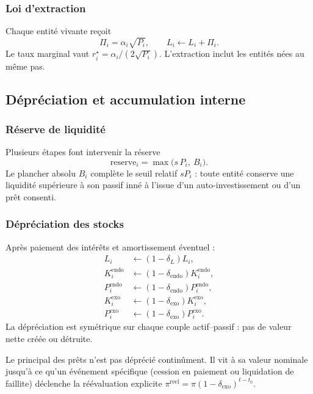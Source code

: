 \documentclass[10pt,a4paper]{article}
\begin{document}
\subsubsection{Loi d'extraction}

Chaque entité vivante reçoit
\[
\Pi_i = \alpha_i\sqrt{P_i},\qquad L_i \leftarrow L_i + \Pi_i.
\]
Le taux marginal vaut \(r_i^\star = \alpha_i/(2\sqrt{P_i})\). L'extraction inclut les entités nées au même pas.

\subsection{Dépréciation et accumulation interne}

\subsubsection{Réserve de liquidité}

Plusieurs étapes font intervenir la réserve
\[
\mathrm{reserve}_i = \max\!\bigl(s\,P_i,\ B_i\bigr).
\]
Le plancher absolu \(B_i\) complète le seuil relatif \(sP_i\) : toute entité conserve une liquidité supérieure à son passif inné à l'issue d'un auto-investissement ou d'un prêt consenti.

\subsubsection{Dépréciation des stocks}

Après paiement des intérêts et amortissement éventuel :
\begin{align*}
L_i &\leftarrow (1-\delta_L)L_i,\\
K_i^{\mathrm{endo}} &\leftarrow (1-\delta_{\mathrm{endo}})K_i^{\mathrm{endo}},\\
P_i^{\mathrm{endo}} &\leftarrow (1-\delta_{\mathrm{endo}})P_i^{\mathrm{endo}},\\
K_i^{\mathrm{exo}} &\leftarrow (1-\delta_{\mathrm{exo}})K_i^{\mathrm{exo}},\\
P_i^{\mathrm{exo}} &\leftarrow (1-\delta_{\mathrm{exo}})P_i^{\mathrm{exo}}.
\end{align*}
La dépréciation est symétrique sur chaque couple actif--passif : pas de valeur nette créée ou détruite.

Le principal des prêts n'est pas déprécié continûment. Il vit à sa valeur nominale jusqu'à ce qu'un événement spécifique (cession en paiement ou liquidation de faillite) déclenche la réévaluation explicite \(\pi^{\mathrm{reel}} = \pi(1-\delta_{\mathrm{exo}})^{t-t_0}\).
\end{document}
